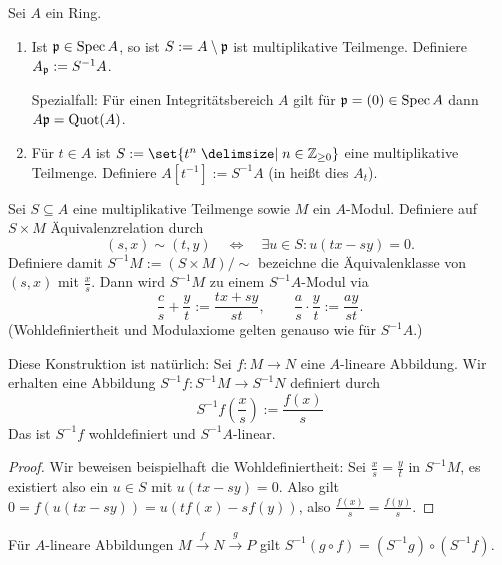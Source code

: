 \documentclass[12pt,a4paper]{scrartcl}
\theoremstyle{cplain}
\theoremstyle{cdef}
\begin{document}
\begin{bsp}
	Sei $A$ ein Ring.
	\begin{enumerate}
		\item Ist $\mathfrak{p}\in \operatorname{Spec} A$, so ist $S := A\setminus \mathfrak{p}$ ist multiplikative Teilmenge. Definiere $A_{\mathfrak{p}} := S^{-1}A$.
		
		Spezialfall: Für einen Integritätsbereich $A$ gilt für $\mathfrak{p} = (0) \in \operatorname{Spec} A$ dann $A \mathfrak{p} = \operatorname{Quot}(A)$.
		\item Für $t\in A$ ist $S := \set{t^n\given n\in\IZ_{\geq 0}}$ eine multiplikative Teilmenge. Definiere $A[t^{-1}] := S^{-1}A$ (in \cite{atiyah-macdonald} heißt dies $A_t$).
	\end{enumerate}
\end{bsp}

\begin{defi}
	Sei $S\subseteq A$ eine multiplikative Teilmenge sowie $M$ ein $A$-Modul. Definiere auf $S\times M$ Äquivalenzrelation durch
	\[(s,x)\sim (t,y) \quad \Longleftrightarrow \quad \exists u\in S: u(tx-sy) =0.\]
	Definiere damit $S^{-1}M := (S\times M)/\sim$ bezeichne die Äquivalenklasse von $(s,x)$ mit $\frac xs$. Dann wird $S^{-1}M$ zu einem $S^{-1}A$-Modul via
	\[\frac cs +\frac yt := \frac{tx+sy}{st},\qquad \frac{a}{s}\cdot \frac{y}{t} := \frac{ay}{st}.\]
	(Wohldefiniertheit und Modulaxiome gelten genauso wie für $S^{-1}A$.)
\end{defi}

\begin{bem}
	Diese Konstruktion ist natürlich: Sei $f\colon M\to N$ eine $A$-lineare Abbildung. Wir erhalten eine Abbildung $S^{-1}f\colon S^{-1}M\to S^{-1}N$ definiert durch
	\[S^{-1}f\left(\frac{x}{s}\right) := \frac{f(x)}{s}\]
	Das ist $S^{-1}f$ wohldefiniert und $S^{-1}A$-linear.
	\begin{proof}
		Wir beweisen beispielhaft die Wohldefiniertheit: Sei $\frac xs = \frac yt$ in $S^{-1}M$, es existiert also ein $u\in S$ mit $u(tx-sy) = 0$. Also gilt $0 = f(u(tx-sy)) = u(tf(x)-sf(y))$, also $\frac{f(x)}{s} = \frac{f(y)}{s}$.
	\end{proof}
	Für $A$-lineare Abbildungen $M\xrightarrow{f}N\xrightarrow{g}P$ gilt $S^{-1}(g\circ f) = (S^{-1}g)\circ(S^{-1}f)$.
\end{bem}
\end{document}
